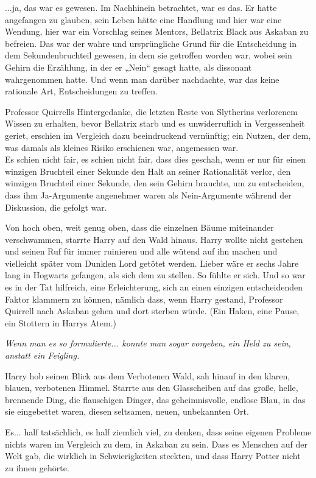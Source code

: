 {...ja, das war es gewesen. Im Nachhinein betrachtet, war es das. Er hatte angefangen zu glauben, sein Leben hätte eine Handlung und hier war eine Wendung, hier war ein Vorschlag seines Mentors, Bellatrix Black aus Askaban zu befreien. Das war der wahre und ursprüngliche Grund für die Entscheidung in dem Sekundenbruchteil gewesen, in dem sie getroffen worden war, wobei sein Gehirn die Erzählung, in der er „Nein“ gesagt hatte, als dissonant wahrgenommen hatte. Und wenn man darüber nachdachte, war das keine rationale Art, Entscheidungen zu treffen.

Professor Quirrells Hintergedanke, die letzten Reste von Slytherins verlorenem Wissen zu erhalten, bevor Bellatrix starb und es unwiderruflich in Vergessenheit geriet, erschien im Vergleich dazu beeindruckend vernünftig; ein Nutzen, der dem, was damals als kleines Risiko erschienen war, angemessen war.\\ Es schien nicht fair, es schien nicht fair, dass dies geschah, wenn er nur für einen winzigen Bruchteil einer Sekunde den Halt an seiner Rationalität verlor, den winzigen Bruchteil einer Sekunde, den sein Gehirn brauchte, um zu entscheiden, dass ihm Ja-Argumente angenehmer waren als Nein-Argumente während der Diskussion, die gefolgt war.

Von hoch oben, weit genug oben, dass die einzelnen Bäume miteinander verschwammen, starrte Harry auf den Wald hinaus. Harry wollte nicht gestehen und seinen Ruf für immer ruinieren und alle wütend auf ihn machen und vielleicht später vom Dunklen Lord getötet werden. Lieber wäre er sechs Jahre lang in Hogwarts gefangen, als sich dem zu stellen. So fühlte er sich. Und so war es in der Tat hilfreich, eine Erleichterung, sich an einen einzigen entscheidenden Faktor klammern zu können, nämlich dass, wenn Harry gestand, Professor Quirrell nach Askaban gehen und dort sterben würde. (Ein Haken, eine Pause, ein Stottern in Harrys Atem.)

\emph{Wenn man es so formulierte... konnte man sogar vorgeben, ein Held zu sein, anstatt ein Feigling.}

Harry hob seinen Blick aus dem Verbotenen Wald, sah hinauf in den klaren, blauen, verbotenen Himmel. Starrte aus den Glasscheiben auf das große, helle, brennende Ding, die flauschigen Dinger, das geheimnisvolle, endlose Blau, in das sie eingebettet waren, diesen seltsamen, neuen, unbekannten Ort.

Es... half tatsächlich, es half ziemlich viel, zu denken, dass seine eigenen Probleme nichts waren im Vergleich zu dem, in Askaban zu sein. Dass es Menschen auf der Welt gab, die wirklich in Schwierigkeiten steckten, und dass Harry Potter nicht zu ihnen gehörte.

}
